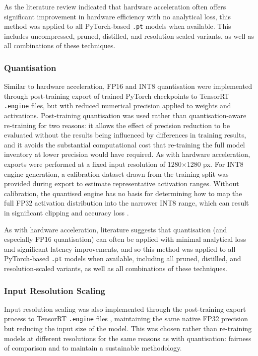 As the literature review indicated that hardware acceleration often offers significant improvement in hardware efficiency with no analytical loss, this method was applied to all PyTorch-based \verb|.pt| models when available. This includes uncompressed, pruned, distilled, and resolution-scaled variants, as well as all combinations of these techniques. 

\subsubsection{Quantisation}

Similar to hardware acceleration, FP16 and INT8 quantisation were implemented through post-training export of trained PyTorch checkpoints to TensorRT \texttt{.engine} files, but with reduced numerical precision applied to weights and activations. Post-training quantisation was used rather than quantisation-aware re-training for two reasons: it allows the effect of precision reduction to be evaluated without the results being influenced by differences in training results, and it avoids the substantial computational cost that re-training the full model inventory at lower precision would have required. As with hardware acceleration, exports were performed at a fixed input resolution of 1280$\times$1280 px. For INT8 engine generation, a calibration dataset drawn from the training split was provided during export to estimate representative activation ranges. Without calibration, the quantised engine has no basis for determining how to map the full FP32 activation distribution into the narrower INT8 range, which can result in significant clipping and accuracy loss \cite{nvidia_modelopt}.

As with hardware acceleration, literature suggests that quantisation (and especially FP16 quantisation) can often be applied with minimal analytical loss and significant latency improvements, and so this method was applied to all PyTorch-based \verb|.pt| models when available, including all pruned, distilled, and resolution-scaled variants, as well as all combinations of these techniques.

\subsubsection{Input Resolution Scaling}
Input resolution scaling was also implemented through the post-training export process to TensorRT \texttt{.engine} files \cite{tensorrt}, maintaining the same native FP32 precision but reducing the input size of the model. This was chosen rather than re-training models at different resolutions for the same reasons as with quantisation: fairness of comparison and to maintain a sustainable methodology. 

